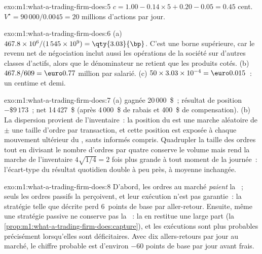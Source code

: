 \begin{solution}{exo:m1:what-a-trading-firm-does:5}
$c = 1.00 - 0.14 \times 5 + 0.20 - 0.05 = 0.45$ cent. $V^\star = 90\,000 /
0.0045 = 20$ millions d'actions par jour.
\end{solution}

\begin{solution}{exo:m1:what-a-trading-firm-does:6}
(a) $467.8 \times 10^6 / (1\,545 \times 10^9) = \qty{3.03}{\bp}$. C'est une
borne supérieure, car le revenu net de négociation inclut aussi les opérations de la société sur
d'autres classes d'actifs, alors que le dénominateur ne retient que les produits
cotés. (b) $467.8/609 = \text{\euro}0.77$ million par salarié. (c)
$50 \times 3.03 \times 10^{-4} = \text{\euro}0.015$~: un centime et demi.
\end{solution}

\begin{solution}{exo:m1:what-a-trading-firm-does:7}
(a)  gagnée 20\,000~\$~; résultat de position $-\$9\,173$~; net 14\,427~\$ (après
4\,000~\$ de rabais et 400~\$ de compensation). (b) La dispersion provient de
l'inventaire~: la position du  est une marche aléatoire de $\pm$ une taille
d'ordre par transaction, et cette position est exposée à chaque mouvement ultérieur du
, sauts informés compris. Quadrupler la taille des ordres tout en divisant le
nombre d'ordres par quatre conserve le volume mais rend la marche de l'inventaire
$4\sqrt{1/4} = 2$ fois plus grande à tout moment de la journée~: l'écart-type
du résultat quotidien double à peu près, à moyenne inchangée.
\end{solution}

\begin{solution}{exo:m1:what-a-trading-firm-does:8}
D'abord, les ordres au marché \emph{paient} la ~; seuls les ordres passifs la perçoivent,
et leur exécution n'est pas garantie~: la stratégie telle que décrite perd 6~points
de base par aller-retour. Ensuite, même une stratégie passive ne conserve pas la
~: la  en restitue une large part
(la \cref{prop:m1:what-a-trading-firm-does:capture}), et les exécutions sont plus probables
précisément lorsqu'elles sont déficitaires. Avec dix allers-retours par jour au marché, le
chiffre probable est d'environ $-60$ points de base par jour avant frais.
\end{solution}

